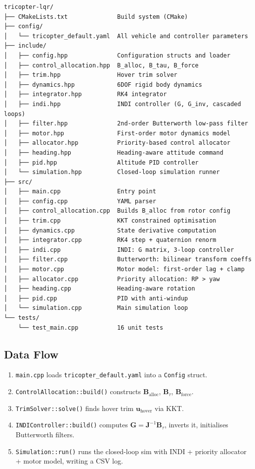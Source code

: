 \documentclass[12pt, a4paper]{article}
\newcommand{\bu}{\bm{u}}
\newcommand{\bJ}{\bm{J}}
\newcommand{\bB}{\bm{B}}
\begin{document}
\begin{verbatim}
tricopter-lqr/
├── CMakeLists.txt              Build system (CMake)
├── config/
│   └── tricopter_default.yaml  All vehicle and controller parameters
├── include/
│   ├── config.hpp              Configuration structs and loader
│   ├── control_allocation.hpp  B_alloc, B_tau, B_force
│   ├── trim.hpp                Hover trim solver
│   ├── dynamics.hpp            6DOF rigid body dynamics
│   ├── integrator.hpp          RK4 integrator
│   ├── indi.hpp                INDI controller (G, G_inv, cascaded loops)
│   ├── filter.hpp              2nd-order Butterworth low-pass filter
│   ├── motor.hpp               First-order motor dynamics model
│   ├── allocator.hpp           Priority-based control allocator
│   ├── heading.hpp             Heading-aware attitude command
│   ├── pid.hpp                 Altitude PID controller
│   └── simulation.hpp          Closed-loop simulation runner
├── src/
│   ├── main.cpp                Entry point
│   ├── config.cpp              YAML parser
│   ├── control_allocation.cpp  Builds B_alloc from rotor config
│   ├── trim.cpp                KKT constrained optimisation
│   ├── dynamics.cpp            State derivative computation
│   ├── integrator.cpp          RK4 step + quaternion renorm
│   ├── indi.cpp                INDI: G matrix, 3-loop controller
│   ├── filter.cpp              Butterworth: bilinear transform coeffs
│   ├── motor.cpp               Motor model: first-order lag + clamp
│   ├── allocator.cpp           Priority allocation: RP > yaw
│   ├── heading.cpp             Heading-aware rotation
│   ├── pid.cpp                 PID with anti-windup
│   └── simulation.cpp          Main simulation loop
└── tests/
    └── test_main.cpp           16 unit tests
\end{verbatim}

\subsection{Data Flow}

\begin{enumerate}
    \item \texttt{main.cpp} loads \texttt{tricopter\_default.yaml} into a \texttt{Config} struct.
    \item \texttt{ControlAllocation::build()} constructs $\bB_{\text{alloc}}$, $\bB_\tau$, $\bB_{\text{force}}$.
    \item \texttt{TrimSolver::solve()} finds hover trim $\bu_{\text{hover}}$ via KKT.
    \item \texttt{INDIController::build()} computes $\bm{G} = \bJ^{-1}\bB_\tau$, inverts it, initialises Butterworth filters.
    \item \texttt{Simulation::run()} runs the closed-loop sim with INDI + priority allocator + motor model, writing a CSV log.
\end{enumerate}
\end{document}
